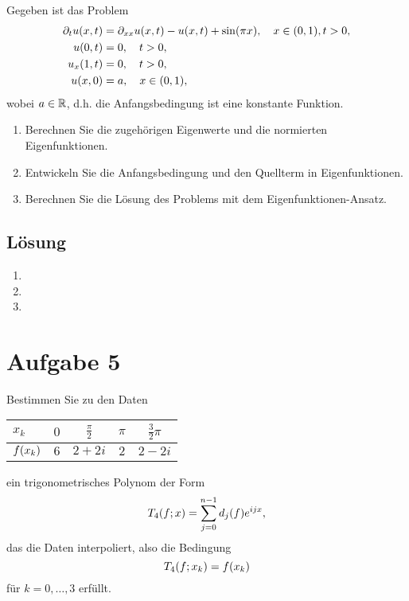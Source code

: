 \documentclass{exercise}
\begin{document}
    \begin{problem}
        Gegeben ist das Problem
        \begin{align*}
            \partial_t u\parentheses*{x, t} &= \partial_{xx}u\parentheses*{x, t} - u\parentheses*{x, t} + \sin\parentheses*{\pi x}, \quad x \in \parentheses*{0, 1}, t > 0,\\
            u\parentheses*{0, t} &= 0, \quad t > 0,\\
            u_x\parentheses*{1, t} &= 0, \quad t > 0,\\
            u\parentheses*{x, 0} &= a, \quad x \in \parentheses*{0, 1},
        \end{align*}
        wobei \(a \in \mathbb{R}\), d.h. die Anfangsbedingung ist eine konstante Funktion.
        \begin{enumerate}
            \item Berechnen Sie die zugehörigen Eigenwerte und die normierten Eigenfunktionen.
            \item Entwickeln Sie die Anfangsbedingung und den Quellterm in Eigenfunktionen.
            \item Berechnen Sie die Lösung des Problems mit dem Eigenfunktionen-Ansatz.
        \end{enumerate}
    \end{problem}
    
    \subsection*{Lösung}
    \begin{enumerate}
        \item
        \item
        \item
    \end{enumerate}


    \section*{Aufgabe 5}
    
    \begin{problem}
        Bestimmen Sie zu den Daten
        \begin{center}
            \begin{tabular}{lcccc}
                \toprule
                \(x_k\) & \(0\) & \(\frac{\pi}{2}\) & \(\pi\) & \(\frac{3}{2}\pi\)\\
                \midrule
                \(f\parentheses*{x_k}\) & \(6\) & \(2 + 2i\) & \(2\) & \(2 - 2i\)\\
            \end{tabular}
        \end{center}
        ein trigonometrisches Polynom der Form
        \[
            T_4\parentheses*{f; x} = \sum_{j = 0}^{n - 1}d_j\parentheses*{f}e^{ijx},
        \]
        das die Daten interpoliert, also die Bedingung
        \[
            T_4\parentheses*{f; x_k} = f\parentheses*{x_k}
        \]
        für \(k = 0, \ldots, 3\) erfüllt.
    \end{problem}
    
\end{document}
